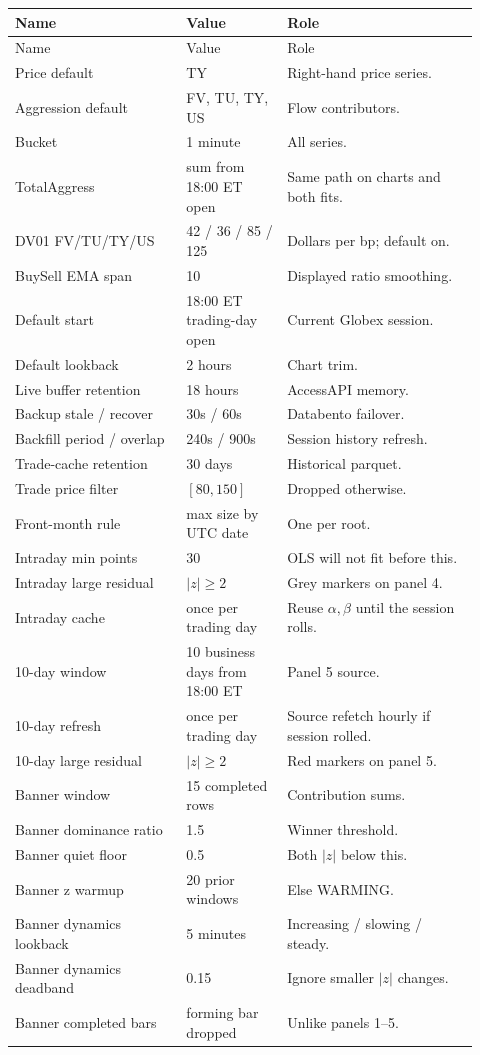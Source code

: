 \documentclass[11pt]{article}
\newcommand{\code}[1]{\texttt{\detokenize{#1}}}
\begin{document}
\begin{longtable}{@{}p{0.34\linewidth}p{0.20\linewidth}p{0.38\linewidth}@{}}
\toprule
Name & Value & Role \\
\midrule
\endfirsthead
\toprule
Name & Value & Role \\
\midrule
\endhead
Price default & TY & Right-hand price series. \\
Aggression default & FV, TU, TY, US & Flow contributors. \\
Bucket & 1 minute & All series. \\
TotalAggress & sum from 18:00 ET open & Same path on charts and both fits. \\
DV01 FV/TU/TY/US & 42 / 36 / 85 / 125 & Dollars per bp; default on. \\
BuySell EMA span & 10 & Displayed ratio smoothing. \\
Default start & 18:00 ET trading-day open & Current Globex session. \\
Default lookback & 2 hours & Chart trim. \\
Live buffer retention & 18 hours & AccessAPI memory. \\
Backup stale / recover & 30s / 60s & Databento failover. \\
Backfill period / overlap & 240s / 900s & Session history refresh. \\
Trade-cache retention & 30 days & Historical parquet. \\
Trade price filter & \([80,150]\) & Dropped otherwise. \\
Front-month rule & max size by UTC date & One \code{instrument_id} per root. \\
Intraday min points & 30 & OLS will not fit before this. \\
Intraday large residual & \(|z|\ge 2\) & Grey markers on panel 4. \\
Intraday cache & once per trading day & Reuse \(\alpha,\beta\) until the session rolls. \\
10-day window & 10 business days from 18:00 ET & Panel 5 source. \\
10-day refresh & once per trading day & Source refetch hourly if session rolled. \\
10-day large residual & \(|z|\ge 2\) & Red markers on panel 5. \\
Banner window & 15 completed rows & Contribution sums. \\
Banner dominance ratio & 1.5 & Winner threshold. \\
Banner quiet floor & 0.5 & Both \(|z|\) below this. \\
Banner z warmup & 20 prior windows & Else WARMING. \\
Banner dynamics lookback & 5 minutes & Increasing / slowing / steady. \\
Banner dynamics deadband & 0.15 & Ignore smaller \(|z|\) changes. \\
Banner completed bars & forming bar dropped & Unlike panels 1--5. \\
\bottomrule
\end{longtable}
\end{document}
